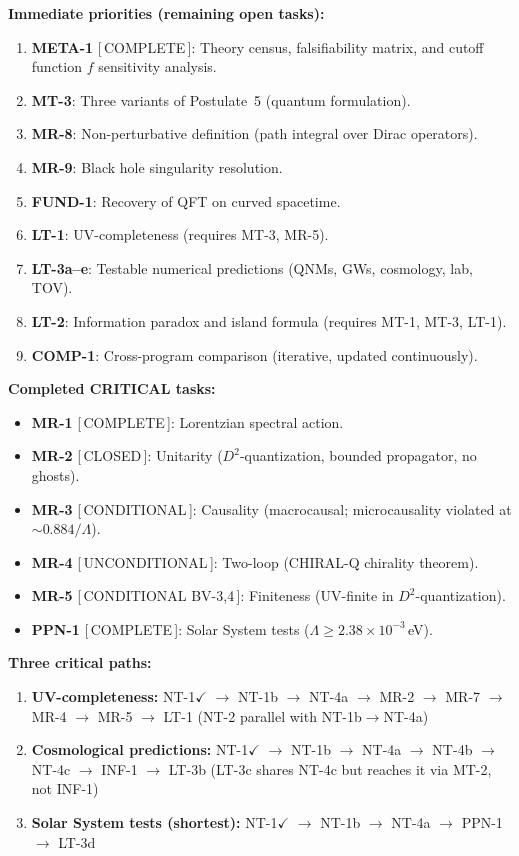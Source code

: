 \documentclass[12pt,a4paper]{article}
\begin{document}
\textbf{Immediate priorities (remaining open tasks):}
\begin{enumerate}
  \item \textbf{META-1} \textcolor{proven}{[\,COMPLETE\,]}: Theory census,
    falsifiability matrix, and cutoff function $f$ sensitivity analysis.
  \item \textbf{MT-3}: Three variants of Postulate~5 (quantum formulation).
  \item \textbf{MR-8}: Non-perturbative definition (path integral over Dirac operators).
  \item \textbf{MR-9}: Black hole singularity resolution.
  \item \textbf{FUND-1}: Recovery of QFT on curved spacetime.
  \item \textbf{LT-1}: UV-completeness (requires MT-3, MR-5).
  \item \textbf{LT-3a--e}: Testable numerical predictions (QNMs, GWs, cosmology, lab, TOV).
  \item \textbf{LT-2}: Information paradox and island formula (requires MT-1, MT-3, LT-1).
  \item \textbf{COMP-1}: Cross-program comparison (iterative, updated continuously).
\end{enumerate}

\textbf{Completed CRITICAL tasks:}
\begin{itemize}
  \item \textbf{MR-1} \textcolor{proven}{[\,COMPLETE\,]}: Lorentzian spectral action.
  \item \textbf{MR-2} \textcolor{proven}{[\,CLOSED\,]}: Unitarity ($D^2$-quantization, bounded propagator, no ghosts).
  \item \textbf{MR-3} \textcolor{near}{[\,CONDITIONAL\,]}: Causality (macrocausal; microcausality violated at $\sim 0.884/\Lambda$).
  \item \textbf{MR-4} \textcolor{proven}{[\,UNCONDITIONAL\,]}: Two-loop (CHIRAL-Q chirality theorem).
  \item \textbf{MR-5} \textcolor{near}{[\,CONDITIONAL BV-3,4\,]}: Finiteness (UV-finite in $D^2$-quantization).
  \item \textbf{PPN-1} \textcolor{proven}{[\,COMPLETE\,]}: Solar System tests ($\Lambda \geq 2.38 \times 10^{-3}$\,eV).
\end{itemize}

\textbf{Three critical paths:}
\begin{enumerate}
  \item \textbf{UV-completeness:} NT-1$\checkmark$ $\to$ NT-1b $\to$ NT-4a $\to$
    MR-2 $\to$ MR-7 $\to$ MR-4 $\to$ MR-5 $\to$ LT-1 (NT-2 parallel with NT-1b$\to$NT-4a)
  \item \textbf{Cosmological predictions:} NT-1$\checkmark$ $\to$ NT-1b $\to$
    NT-4a $\to$ NT-4b $\to$ NT-4c $\to$ INF-1 $\to$ LT-3b
    (LT-3c shares NT-4c but reaches it via MT-2, not INF-1)
  \item \textbf{Solar System tests (shortest):} NT-1$\checkmark$ $\to$ NT-1b $\to$
    NT-4a $\to$ PPN-1 $\to$ LT-3d
\end{enumerate}
\end{document}
